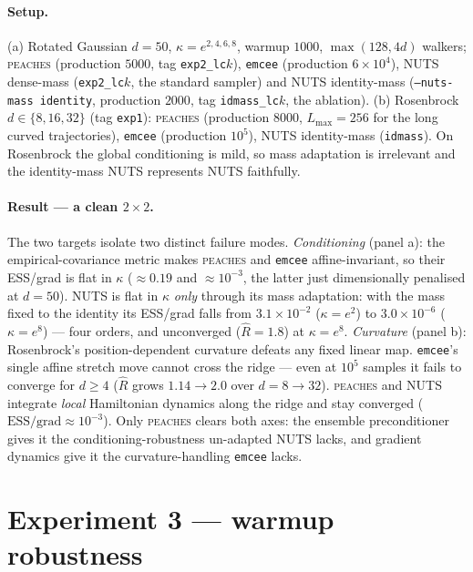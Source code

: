\documentclass[11pt]{article}
\begin{document}
\paragraph{Setup.} (a) Rotated Gaussian $d{=}50$, $\kappa=e^{2,4,6,8}$, warmup
$1000$, $\max(128,4d)$ walkers; \textsc{peaches} (production $5000$, tag
\texttt{exp2\_lc$k$}), \texttt{emcee} (production $6\!\times\!10^4$), NUTS
dense-mass (\texttt{exp2\_lc$k$}, the standard sampler) and NUTS identity-mass
(\texttt{--nuts-mass identity}, production $2000$, tag \texttt{idmass\_lc$k$},
the ablation). (b) Rosenbrock $d\in\{8,16,32\}$ (tag \texttt{exp1}):
\textsc{peaches} (production $8000$, $L_{\max}=256$ for the long curved
trajectories), \texttt{emcee} (production $10^5$), NUTS identity-mass
(\texttt{idmass}). On Rosenbrock the global conditioning is mild, so mass
adaptation is irrelevant and the identity-mass NUTS represents NUTS faithfully.

\paragraph{Result --- a clean $2\times2$.} The two targets isolate two distinct
failure modes. \emph{Conditioning} (panel a): the empirical-covariance metric
makes \textsc{peaches} and \texttt{emcee} affine-invariant, so their ESS/grad is
flat in $\kappa$ ($\approx\!0.19$ and $\approx\!10^{-3}$, the latter just
dimensionally penalised at $d{=}50$). NUTS is flat in $\kappa$ \emph{only}
through its mass adaptation: with the mass fixed to the identity its ESS/grad
falls from $3.1\times10^{-2}$ ($\kappa=e^2$) to $3.0\times10^{-6}$
($\kappa=e^8$) --- four orders, and unconverged ($\hat R=1.8$) at $\kappa=e^8$.
\emph{Curvature} (panel b): Rosenbrock's position-dependent curvature defeats
any fixed linear map. \texttt{emcee}'s single affine stretch move cannot cross
the ridge --- even at $10^5$ samples it fails to converge for $d\ge4$
($\hat R$ grows $1.14\!\to\!2.0$ over $d{=}8\!\to\!32$). \textsc{peaches} and
NUTS integrate \emph{local} Hamiltonian dynamics along the ridge and stay
converged ($\text{ESS}/\text{grad}\approx10^{-3}$). Only \textsc{peaches} clears
both axes: the ensemble preconditioner gives it the conditioning-robustness
un-adapted NUTS lacks, and gradient dynamics give it the curvature-handling
\texttt{emcee} lacks.

\section{Experiment 3 --- warmup robustness}\label{sec:warmup}
\end{document}
